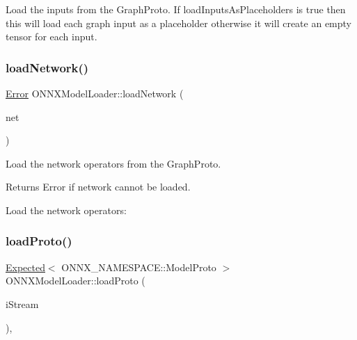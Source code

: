 Load the inputs from the Graph\+Proto. If {\ttfamily load\+Inputs\+As\+Placeholders} is true then this will load each graph input as a placeholder otherwise it will create an empty tensor for each input. \mbox{\label{classglow_1_1_o_n_n_x_model_loader_a58b2261b6839659a524fe1c60da69a57}} 
\subsubsection{\texorpdfstring{load\+Network()}{loadNetwork()}}
{\footnotesize\ttfamily \hyperlink{namespaceglow_afdb176c3a672ef66db0ecfc19a8d39bf}{Error} O\+N\+N\+X\+Model\+Loader\+::load\+Network (\begin{DoxyParamCaption}\item[{O\+N\+N\+X\+\_\+\+N\+A\+M\+E\+S\+P\+A\+C\+E\+::\+Graph\+Proto \&}]{net }\end{DoxyParamCaption})\hspace{0.3cm}{\ttfamily [protected]}}

Load the network operators from the Graph\+Proto. \begin{DoxyReturn}{Returns}
Error if network cannot be loaded. 
\end{DoxyReturn}
Load the network operators\+: \mbox{\label{classglow_1_1_o_n_n_x_model_loader_a5400313d3234e910faae69a942d31b17}} 
\subsubsection{\texorpdfstring{load\+Proto()}{loadProto()}\hspace{0.1cm}{\footnotesize\ttfamily [1/3]}}
{\footnotesize\ttfamily \hyperlink{classglow_1_1detail_1_1_glow_expected}{Expected}$<$ O\+N\+N\+X\+\_\+\+N\+A\+M\+E\+S\+P\+A\+C\+E\+::\+Model\+Proto $>$ O\+N\+N\+X\+Model\+Loader\+::load\+Proto (\begin{DoxyParamCaption}\item[{google\+::protobuf\+::io\+::\+Zero\+Copy\+Input\+Stream \&}]{i\+Stream }\end{DoxyParamCaption})\hspace{0.3cm}{\ttfamily [static]}, {\ttfamily [protected]}}

